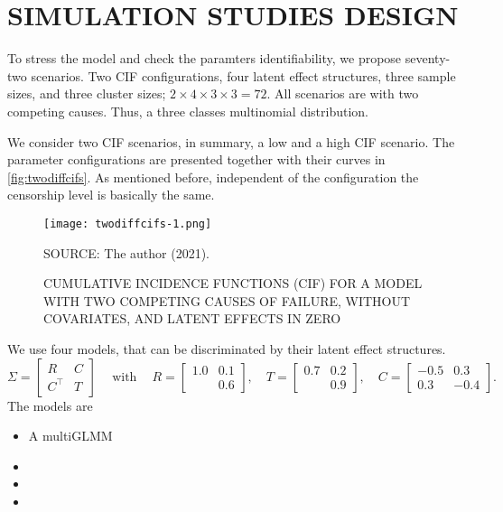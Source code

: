 \section{SIMULATION STUDIES DESIGN}
\label{cap:data}

To stress the model and check the paramters identifiability, we propose
seventy-two scenarios. Two CIF configurations, four latent effect
structures, three sample sizes, and three cluster sizes; \(2 \times
4 \times 3 \times 3 = 72\). All scenarios are with two competing
causes. Thus, a three classes multinomial distribution.

We consider two CIF scenarios, in summary, a low and a high CIF
scenario. The parameter configurations are presented together with their
curves in \autoref{fig:twodiffcifs}. As mentioned before, independent of
the configuration the censorship level is basically the same.

\begin{figure}[H]
 \setlength{\abovecaptionskip}{.0001pt}
 \caption{CUMULATIVE INCIDENCE FUNCTIONS (CIF) FOR A MODEL WITH TWO
          COMPETING CAUSES OF FAILURE, WITHOUT COVARIATES, AND LATENT
          EFFECTS IN ZERO}
 \vspace{0.2cm}\centering
 \texttt{[image: twodiffcifs-1.png]}\\
 \begin{footnotesize}
  SOURCE: The author (2021).
 \end{footnotesize}
 \label{fig:twodiffcifs}
\end{figure}

We use four models, that can be discriminated by their latent effect
structures.
\[
 \Sigma = \begin{bmatrix} R & C\\ C^{\top} & T \end{bmatrix}
 \quad~\text{with}~\quad
 R = \begin{bmatrix} 1.0 & 0.1\\ & 0.6 \end{bmatrix},\quad
 T = \begin{bmatrix} 0.7 & 0.2\\ & 0.9 \end{bmatrix},\quad
 C = \begin{bmatrix} -0.5 & 0.3\\ 0.3 & -0.4 \end{bmatrix}.
\]
The models are
\begin{itemize}
 \item A multiGLMM 

 \item

 \item

 \item
\end{itemize}

